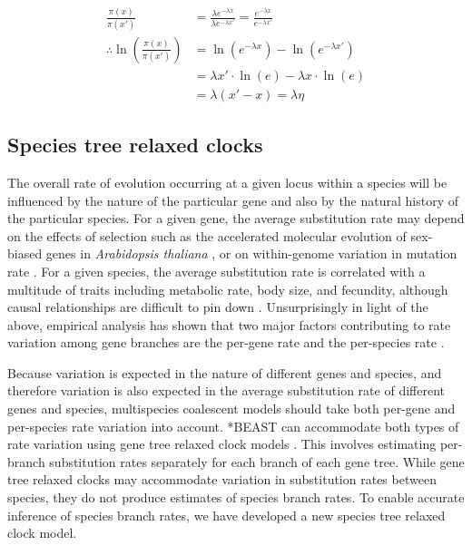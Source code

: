 \documentclass[nogrid]{MBE}%
\begin{document}
\begin{align}
\frac{\pi(x)}{\pi(x')} &= \frac{\lambda e^{-\lambda x}}{\lambda e^{-\lambda x'}} = \frac{e^{-\lambda x}}{e^{-\lambda x'}}\\
\therefore \ln\left(\frac{\pi(x)}{\pi(x')}\right) &= \ln \left(e^{-\lambda x}\right) - \ln \left(e^{-\lambda x'}\right)\\
& = \lambda x' \cdot \ln \left(e\right) - \lambda x \cdot \ln \left(e\right)\\
& = \lambda \left(x' - x\right) = \lambda \eta
\end{align}

\subsection{Species tree relaxed clocks}

The overall rate of evolution occurring at a given locus within a species will
be influenced by the nature of the particular gene and also by the natural
history of the particular species. For a given gene, the average substitution
rate may depend on the effects of selection such as the accelerated molecular
evolution of sex-biased genes in \textit{Arabidopsis thaliana}
\citep{Gossmann01032014}, or on within-genome variation in mutation rate \citep{Baer2007}.
For a given species, the average substitution rate is correlated with a
multitude of traits including metabolic rate, body size, and fecundity, although
causal relationships are difficult to pin down \citep{Bromham2503}.
Unsurprisingly in light of the above, empirical analysis has shown that two
major factors contributing to rate variation among gene branches are the
per-gene rate and the per-species rate \citep{Rasmussen01122007}.

Because variation is expected in the nature of different genes and species, and
therefore variation is also expected in the average substitution rate of different
genes and species, multispecies coalescent models should take both per-gene and
per-species rate variation into account. *BEAST can accommodate both types of
rate variation using gene tree relaxed clock models \citep[for examples see][]{Berv2014120, Lambert2015146}.
This involves estimating per-branch substitution rates separately
for each branch of each gene tree. While gene tree relaxed clocks may
accommodate variation in substitution rates between species, they do not produce
estimates of species branch rates. To enable accurate inference of species
branch rates, we have developed a new species tree relaxed clock model.
\end{document}
